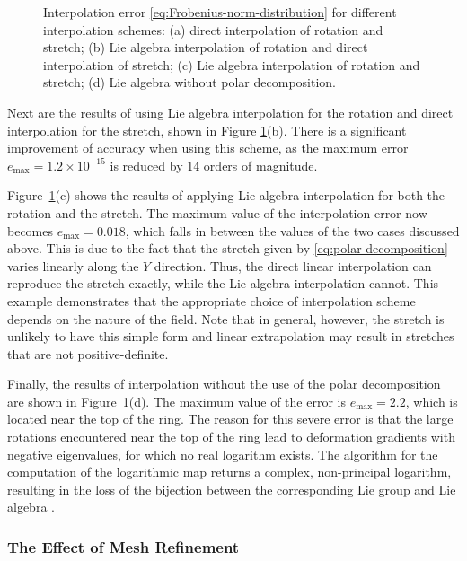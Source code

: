 \documentclass[12pt]{article}
\begin{document}
\begin{figure}[htbp]
\begin{center}
    \caption{Interpolation error \eqref{eq:Frobenius-norm-distribution}
      for different interpolation schemes: (a) direct interpolation of
      rotation and stretch; (b) Lie algebra interpolation of rotation
      and direct interpolation of stretch; (c) Lie algebra
      interpolation of rotation and stretch; (d) Lie algebra without polar
      decomposition.}
    \label{fig:example-ring}
  \end{center}
\end{figure}

Next are the results of using Lie algebra interpolation for the rotation and
direct interpolation for the stretch, shown in Figure \ref{fig:example-ring}(b).
There is a significant improvement of accuracy when using this scheme, as the
maximum error $e_{\text{max}} = 1.2 \times 10^{-15}$ is reduced by $14$ orders
of magnitude.

Figure~\ref{fig:example-ring}(c) shows the results of applying Lie
algebra interpolation for both the rotation and the stretch. The maximum value
of the interpolation error now becomes $e_{\text{max}} = 0.018$, which falls in
between the values of the two cases discussed above. This is due to the fact
that the stretch given by \eqref{eq:polar-decomposition} varies linearly along
the $Y$ direction. Thus, the direct linear interpolation can reproduce the
stretch exactly, while the Lie algebra interpolation cannot. This example
demonstrates that the appropriate choice of interpolation scheme depends on the
nature of the field. Note that in general, however, the stretch is unlikely to
have this simple form and linear extrapolation may result in stretches that are
not positive-definite.

Finally, the results of interpolation without the use of the polar decomposition
are shown in Figure~\ref{fig:example-ring}(d). The maximum value of the error is
$e_{\text{max}} = 2.2$, which is located near the top of the ring. The reason
for this severe error is that the large rotations encountered near the top of
the ring lead to deformation gradients with negative eigenvalues, for which no
real logarithm exists. The algorithm for the computation of the logarithmic map
returns a complex, non-principal logarithm, resulting in the loss of the
bijection between the corresponding Lie group and Lie algebra
\citep{Higham:2008}.

\subsubsection{The Effect of Mesh Refinement}
\end{document}
